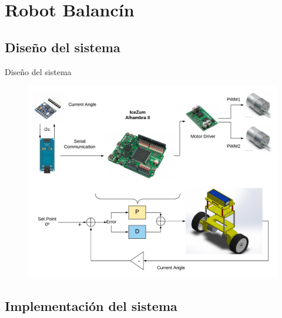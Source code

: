 \documentclass{beamer}
\begin{document}
\section{Robot Balancín}
\subsection{Diseño del sistema}
\begin{frame}{Diseño del sistema}
\begin{figure}[H]
	\center
	\includegraphics[trim = 0mm 0mm 0mm 0mm, clip,scale=0.3]{imagenes/Balancing_robot/final.pdf}
	\caption{}
	\label{}
\end{figure}
\end{frame}	
\subsection{Implementación del sistema}
\end{document}
